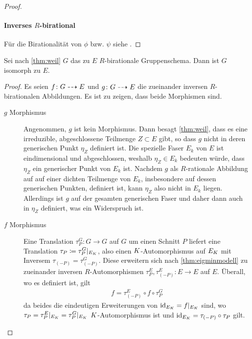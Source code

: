 \begin{Lemma}
\begin{proof}
    \paragraph{Inverses $R$-birational}
    Für die Birationalität von $\phi$ bzw. $\psi$ siehe
    \cite[Propsition IV.6.10]{silverman2}.
  \end{proof}
\end{Lemma}

\begin{Lemma}\label{thm:äqgruppenschema}
  Sei nach \ref{thm:weil} $G$ das zu $E$ $R$-birationale
  Gruppenschema. Dann ist $G$ isomorph zu $E$.
  \begin{proof}
    Es seien $f\colon G\dashrightarrow E$ und $g\colon G\dashrightarrow E$ die
    zueinander inversen $R$-birationalen Abbildungen.
    Es ist zu zeigen, dass beide Morphismen sind.
    \begin{description}
    \item[$g$ Morphismus] Angenommen, $g$ ist kein
      Morphismus. Dann besagt \ref{thm:weil}, dass es eine
      irreduzible, abgeschlossene Teilmenge $Z\subset E$ gibt, so
      dass $g$ nicht in deren generischen Punkt $\eta_Z$ definiert
      ist. Die spezielle Faser $E_k$ von $E$ ist eindimensional und
      abgeschlossen, weshalb $\eta_Z\in E_k$ bedeuten würde, dass
      $\eta_Z$ ein generischer Punkt von $E_k$ ist.
      Nachdem $g$ als $R$-rationale Abbildung auf auf einer
      dichten Teilmenge von $E_k$, insbesondere auf dessen
      generischen Punkten, definiert ist, kann $\eta_Z$ also nicht in
      $E_k$ liegen.
      Allerdings ist $g$ auf der gesamten generischen Faser und daher
      dann auch in $\eta_Z$ definiert, was ein Widerspruch ist.
    \item[$f$ Morphismus] Eine Translation $\tau_P^G\colon G\to G$
      auf $G$ um einen Schnitt $P$ liefert eine Translation
      $\tau_P\coloneqq\tau_P^G|_{E_{K}}$, also einen
      $K$-Automorphismus auf $E_{K}$ mit Inversem
      $\tau_{(-P)}=\tau_{(-P)}^G$. Diese 
      erweitern sich nach \ref{thm:eigminmodell} zu zueinander
      inversen $R$-Automorphismen
      $\tau_P^E,\tau_{(-P)}^E\colon E\to E$ auf $E$.
      Überall, wo es definiert ist, gilt
      \begin{gather*}
        f = \tau_{(-P)}^E\circ f\circ \tau_P^G
      \end{gather*}
      da beides die eindeutigen Erweiterungen von
      $\mathrm{id}_{E_{K}}=f|_{E_{K}}$ sind, wo
      $\tau_P=\tau_P^E|_{E_{K}}=\tau_P^G|_{E_{K}}$ $K$-Automorphismus
      ist und $\mathrm{id}_{E_{K}}=\tau_{(-P)}\circ\tau_P$ gilt.
      

\end{description}
\end{proof}
\end{Lemma}
